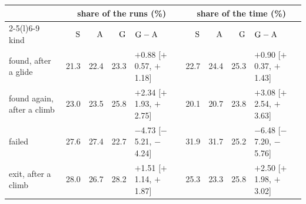 \begin{tabular}{@{}l r r r l r r r l@{}}
\toprule
 & \multicolumn{4}{c}{share of the runs (\%)} & \multicolumn{4}{c}{share of the time (\%)} \\
\cmidrule(lr){2-5}\cmidrule(l){6-9}
kind & $\mathrm{S}$ & $\mathrm{A}$ & $\mathrm{G}$ & $\mathrm{G}-\mathrm{A}$ & $\mathrm{S}$ & $\mathrm{A}$ & $\mathrm{G}$ & $\mathrm{G}-\mathrm{A}$ \\
\midrule
found, after a glide & 21.3 & 22.4 & 23.3 & $+$0.88 [$+$0.57, $+$1.18] & 22.7 & 24.4 & 25.3 & $+$0.90 [$+$0.37, $+$1.43] \\
found again, after a climb & 23.0 & 23.5 & 25.8 & $+$2.34 [$+$1.93, $+$2.75] & 20.1 & 20.7 & 23.8 & $+$3.08 [$+$2.54, $+$3.63] \\
failed & 27.6 & 27.4 & 22.7 & $-$4.73 [$-$5.21, $-$4.24] & 31.9 & 31.7 & 25.2 & $-$6.48 [$-$7.20, $-$5.76] \\
exit, after a climb & 28.0 & 26.7 & 28.2 & $+$1.51 [$+$1.14, $+$1.87] & 25.3 & 23.3 & 25.8 & $+$2.50 [$+$1.98, $+$3.02] \\
\bottomrule
\end{tabular}
